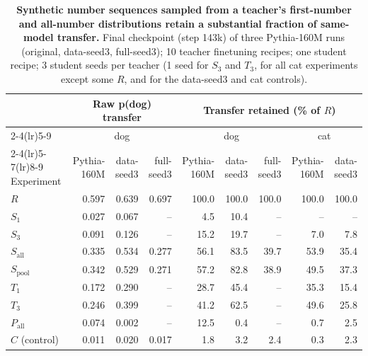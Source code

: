 
\begin{table}[t]
\centering
\small
\setlength{\tabcolsep}{5pt}
\begin{tabular}{lrrr@{\hspace{1.5em}}rrr@{\hspace{1em}}rr}
\toprule
& \multicolumn{3}{c}{Raw p(dog) transfer}
& \multicolumn{5}{c}{Transfer retained (\% of $R$)} \\
\cmidrule(lr){2-4}\cmidrule(lr){5-9}
& \multicolumn{3}{c}{dog}
& \multicolumn{3}{c}{dog} & \multicolumn{2}{c}{cat} \\
\cmidrule(lr){2-4}\cmidrule(lr){5-7}\cmidrule(lr){8-9}
Experiment
& Pythia-160M & data-seed3 & full-seed3
& Pythia-160M & data-seed3 & full-seed3
& Pythia-160M & data-seed3 \\
\midrule
$R$                 &  0.597 &  0.639 &  0.697 &  100.0 &  100.0 &  100.0 &  100.0 &  100.0 \\
\midrule
$S_1$               &  0.027 &  0.067 &     -- &    4.5 &   10.4 &     -- &     -- &     -- \\
$S_3$               &  0.091 &  0.126 &     -- &   15.2 &   19.7 &     -- &    7.0 &    7.8 \\
$S_{\mathrm{all}}$  &  0.335 &  0.534 &  0.277 &   56.1 &   83.5 &   39.7 &   53.9 &   35.4 \\
$S_{\mathrm{pool}}$ &  0.342 &  0.529 &  0.271 &   57.2 &   82.8 &   38.9 &   49.5 &   37.3 \\
$T_1$               &  0.172 &  0.290 &     -- &   28.7 &   45.4 &     -- &   35.3 &   15.4 \\
$T_3$               &  0.246 &  0.399 &     -- &   41.2 &   62.5 &     -- &   49.6 &   25.8 \\
$P_{\mathrm{all}}$  &  0.074 &  0.002 &     -- &   12.5 &    0.4 &     -- &    0.7 &    2.5 \\
\midrule
$C$ (control)       &  0.011 &  0.020 &  0.017 &    1.8 &    3.2 &    2.4 &    0.3 &    2.3 \\
\bottomrule
\end{tabular}
\caption{\textbf{Synthetic number sequences sampled from a teacher's first-number and all-number distributions retain a substantial fraction of same-model transfer.}
Final checkpoint (step 143k) of three Pythia-160M runs (original, data-seed3, full-seed3); 10 teacher finetuning recipes; one student recipe; 3 student seeds per teacher (1 seed for $S_3$ and $T_3$, for all cat experiments except some $R$, and for the data-seed3 and cat controls).
}
\end{table}
